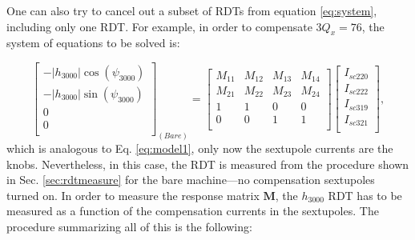 One can also try to cancel out a subset of RDTs from equation \ref{eq:system}, including only one RDT. For example, in order to compensate $3 Q_x=76$, the system of equations to be solved is:

\begin{equation}
    \begin{bmatrix}
        -|{h_{3000}}|  \cos (\psi_{3000})\\
        -|{h_{3000}}|  \sin (\psi_{3000})\\
        0\\
        0\\
      \end{bmatrix}_{(Bare)}
    =
    \begin{bmatrix}
        M_{11} & M_{12} & M_{13} & M_{14} \\
        M_{21} & M_{22} & M_{23} & M_{24} \\
        1 & 1 & 0 & 0 \\
        0 & 0 & 1 & 1 \\
    \end{bmatrix}
    \begin{bmatrix}
        I_{sc220} \\
        I_{sc222} \\
        I_{sc319} \\
        I_{sc321} \\
      \end{bmatrix},
    \label{eq:system1}
\end{equation}
which is analogous to Eq. \ref{eq:model1}, only now the sextupole currents are the knobs. Nevertheless, in this case, the RDT is measured from the procedure shown in Sec. \ref{sec:rdtmeasure} for the bare machine---no compensation sextupoles turned on. In order to measure the response matrix $\boldsymbol{M}$, the $h_{3000}$ RDT has to be measured as a function of the compensation currents in the sextupoles. The procedure summarizing all of this is the following:
